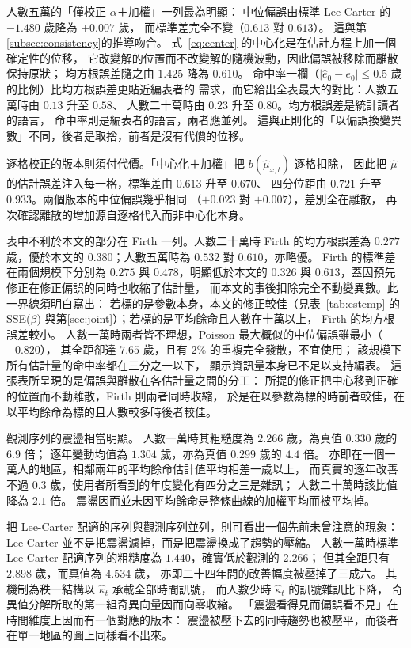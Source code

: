 \documentclass[UTF8, fontset=macnew, a4paper, 12pt]{ctexart}
\begin{document}
人數五萬的「僅校正 $\alpha$＋加權」一列最為明顯：
中位偏誤由標準 Lee-Carter 的 $-1.480$ 歲降為 $+0.007$ 歲，
而標準差完全不變（$0.613$ 對 $0.613$）。
這與第\ref{subsec:consistency}的推導吻合。
式~\eqref{eq:center} 的中心化是在估計方程上加一個確定性的位移，
它改變解的位置而不改變解的隨機波動，因此偏誤被移除而離散保持原狀；
均方根誤差隨之由 $1.425$ 降為 $0.610$。
命中率一欄（$|\hat e_0-e_0|\le0.5$ 歲的比例）比均方根誤差更貼近編表者的
需求，而它給出全表最大的對比：人數五萬時由 $0.13$ 升至 $0.58$、
人數二十萬時由 $0.23$ 升至 $0.80$。均方根誤差是統計讀者的語言，
命中率則是編表者的語言，兩者應並列。
這與正則化的「以偏誤換變異數」不同，後者是取捨，前者是沒有代價的位移。

逐格校正的版本則須付代價。「中心化＋加權」把 $b(\hat\mu_{x,t})$ 逐格扣除，
因此把 $\hat\mu$ 的估計誤差注入每一格，標準差由 $0.613$ 升至 $0.670$、
四分位距由 $0.721$ 升至 $0.933$。兩個版本的中位偏誤幾乎相同
（$+0.023$ 對 $+0.007$），差別全在離散，
再次確認離散的增加源自逐格代入而非中心化本身。

表中不利於本文的部分在 Firth 一列。人數二十萬時 Firth 的均方根誤差為
$0.277$ 歲，優於本文的 $0.380$；人數五萬時為 $0.532$ 對 $0.610$，亦略優。
Firth 的標準差在兩個規模下分別為 $0.275$ 與 $0.478$，明顯低於本文的
$0.326$ 與 $0.613$，蓋因預先修正在修正偏誤的同時也收縮了估計量，
而本文的事後扣除完全不動變異數。此一界線須明白寫出：
若標的是參數本身，本文的修正較佳（見表~\ref{tab:estcmp} 的
SSE($\beta$) 與第\ref{sec:joint}）；若標的是平均餘命且人數在十萬以上，
Firth 的均方根誤差較小。
人數一萬時兩者皆不理想，Poisson 最大概似的中位偏誤雖最小（$-0.820$），
其全距卻達 $7.65$ 歲，且有 $2\%$ 的重複完全發散，不宜使用；
該規模下所有估計量的命中率都在三分之一以下，
顯示資訊量本身已不足以支持編表。
這張表所呈現的是偏誤與離散在各估計量之間的分工：
所提的修正把中心移到正確的位置而不動離散，Firth 則兩者同時收縮，
於是在以參數為標的時前者較佳，在以平均餘命為標的且人數較多時後者較佳。

觀測序列的震盪相當明顯。
人數一萬時其粗糙度為 $2.266$ 歲，為真值 $0.330$ 歲的 $6.9$ 倍；
逐年變動均值為 $1.304$ 歲，亦為真值 $0.299$ 歲的 $4.4$ 倍。
亦即在一個一萬人的地區，相鄰兩年的平均餘命估計值平均相差一歲以上，
而真實的逐年改善不過 $0.3$ 歲，使用者所看到的年度變化有四分之三是雜訊；
人數二十萬時該比值降為 $2.1$ 倍。
震盪因而並未因平均餘命是整條曲線的加權平均而被平均掉。

把 Lee-Carter 配適的序列與觀測序列並列，則可看出一個先前未曾注意的現象：
Lee-Carter 並不是把震盪濾掉，而是把震盪換成了趨勢的壓縮。
人數一萬時標準 Lee-Carter 配適序列的粗糙度為 $1.440$，確實低於觀測的 $2.266$；
但其全距只有 $2.898$ 歲，而真值為 $4.534$ 歲，
亦即二十四年間的改善幅度被壓掉了三成六。
其機制為秩一結構以 $\hat\kappa_t$ 承載全部時間訊號，
而人數少時 $\hat\kappa_t$ 的訊號雜訊比下降，
奇異值分解所取的第一組奇異向量因而向零收縮。
「震盪看得見而偏誤看不見」在時間維度上因而有一個對應的版本：
震盪被壓下去的同時趨勢也被壓平，而後者在單一地區的圖上同樣看不出來。
\end{document}
